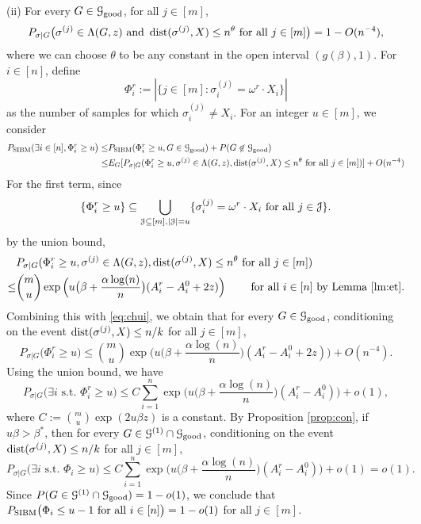 \documentclass{article}
\begin{document}
\noindent (ii) For every $G\in\mathcal{G}_{\operatorname{good}}$, for all $j\in[m]$,
\begin{equation}  \label{eq:chui}
P_{\sigma|G} \big( \sigma^{(j)}\in  \Lambda(G, z)
\text{~and~} \operatorname{dist}(\sigma^{(j)}, X) \le n^\theta
\text{~for all~} j\in[m]  \big)
=1- O(n^{-4}) ,
\end{equation}
where we can choose $\theta$ to be any constant in the open interval $(g(\beta), 1)$.
For $i\in[n]$, define 
$$
\Phi^r_i := |\{j\in[m]: \sigma_i^{(j)} = \omega^r \cdot X_i\}|
$$
as the number of samples for which $\sigma_i^{(j)} \neq X_i$.
For an integer $u\in[m]$, we consider
\begin{align*}
P_{\operatorname{SIBM}}( \exists i \in [n], \Phi^r_i \ge u \big) \leq &P_{\operatorname{SIBM}}( \Phi^r_i \ge u , G \in \mathcal{G}_{\operatorname{good}}) + P(G \not\in \mathcal{G}_{\operatorname{good}}) \\
\leq & E_G[P_{\sigma |G}(\Phi^r_i \ge u, \sigma^{(j)}\in \Lambda(G,z) ,\operatorname{dist}(\sigma^{(j)}, X) \le n^{\theta} \text{~for all~} j\in[m])]+ O(n^{-4})
\end{align*}
For the first term, since
$$
\{\Phi^r_i \ge u\} \subseteq
\bigcup_{\mathcal{J}\subseteq[m], |\mathcal{J}|=u}
\{\sigma_i^{(j)} = \omega^r \cdot X_i \text{~for all~} j\in \mathcal{J}\} .
$$
by the union bound,
\begin{align*}
& P_{\sigma|G}( \Phi^r_i \ge u, \sigma^{(j)}\in \Lambda(G,z) ,\operatorname{dist}(\sigma^{(j)}, X) \le n^{\theta} \text{~for all~} j\in[m] ) \\
\le &  \binom{m}{u} \exp\Big(u\big(\beta+\frac{\alpha\log(n)}{n} \big) (A^r_i-A^0_i + 2z) \Big)
\quad\quad\text{~for all~} i\in[n] \textrm{ by Lemma~\ref{lm:et}}.
\end{align*}
Combining this with \eqref{eq:chui}, we obtain that for every $G\in\mathcal{G}_{\operatorname{good}}$, conditioning on the event $\operatorname{dist}(\sigma^{(j)}, X) \le n/k$ for all $j\in[m]$,
$$
P_{\sigma|G} \big( \Phi^r_i \ge u \big) \le  \binom{m}{u} \exp\Big(u \big(\beta+\frac{\alpha\log(n)}{n} \big) (A^r_i-A^0_i + 2z) \Big) + O(n^{-4}).
$$
Using the union bound, we have
$$
P_{\sigma|G} \big(\exists i \text{~s.t.~} \Phi^r_i \ge u \big) \le 
C  \sum_{i=1}^n \exp\Big(u \big(\beta+\frac{\alpha\log(n)}{n} \big) (A^r_i-A^0_i ) \Big) + o(1) ,
$$
where $C:=\binom{m}{u}\exp(2u\beta z)$ is a constant.
By Proposition \ref{prop:con}, if $u\beta>\beta^*$, then for every $G\in\mathcal{G}^{(1)}\cap\mathcal{G}_{\operatorname{good}}$, conditioning on the event $\operatorname{dist}(\sigma^{(j)}, X) \le n/k$ for all $j\in[m]$,
$$
P_{\sigma|G} \big(\exists i \text{~s.t.~} \Phi_i \ge u \big) \le 
C\sum_{i=1}^n \exp\Big(u \big(\beta+\frac{\alpha\log(n)}{n} \big) (A^r_i-A^0_i ) \Big) + o(1) =o(1).
$$
Since $P(G\in\mathcal{G}^{(1)}\cap\mathcal{G}_{\operatorname{good}})=1-o(1)$, we conclude that $P_{\operatorname{SIBM}} \big(\Phi_i \le u-1 \text{~for all~} i\in[n] \big)=1-o(1)$ for all $j\in[m]$.
\end{document}
